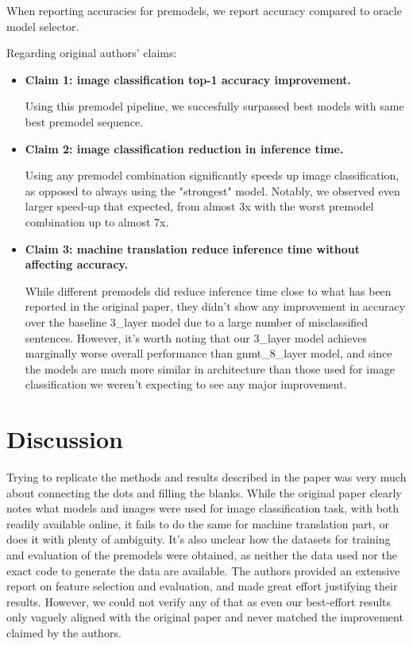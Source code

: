 When reporting accuracies for premodels, we report accuracy compared to oracle model selector.

Regarding original authors' claims:
\begin{itemize}
	\item \textbf{Claim 1: image classification top-1 accuracy improvement.}
	      
	      Using this premodel pipeline, we succesfully surpassed best models with same best premodel sequence.
	      
	\item \textbf{Claim 2: image classification reduction in inference time.}
	      
	      Using any premodel combination significantly speeds up image classification, as opposed to always using the "strongest" model. Notably, we observed even larger speed-up that expected, from almost 3x with the worst premodel combination up to almost 7x.
	      
	\item \textbf{Claim 3: machine translation reduce inference time without affecting accuracy.}
	      
	      While different premodels did reduce inference time close to what has been reported in the original paper, they didn't show any improvement in accuracy over the baseline 3\_layer model due to a large number of misclassified sentences. However, it's worth noting that our 3\_layer model achieves marginally worse overall performance than gnmt\_8\_layer model, and since the models are much more similar in architecture than those used for image classification we weren't expecting to see any major improvement.
	      
\end{itemize}



\section{Discussion}
Trying to replicate the methods and results described in the paper was very much about connecting the dots and filling the blanks. While the original paper clearly notes what models and images were used for image classification task, with both readily available online, it fails to do the same for machine translation part, or does it with plenty of ambiguity. It's also unclear how the datasets for training and evaluation of the premodels were obtained, as neither the data used nor the exact code to generate the data are available. The authors provided an extensive report on feature selection and evaluation, and made great effort justifying their results. However, we could not verify any of that as even our best-effort results only vaguely aligned with the original paper and never matched the improvement claimed by the authors.

